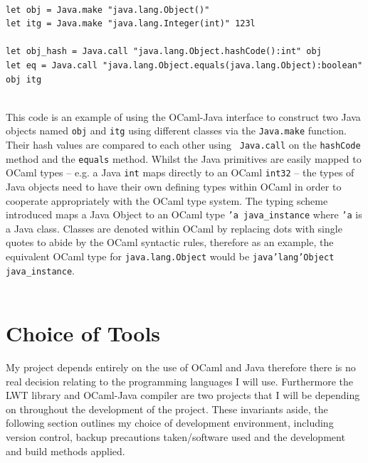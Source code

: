 \documentclass[12pt,twoside,notitlepage]{report}
\begin{document}
\hfill\\
\begin{lstlisting}
let obj = Java.make "java.lang.Object()"
let itg = Java.make "java.lang.Integer(int)" 123l

let obj_hash = Java.call "java.lang.Object.hashCode():int" obj
let eq = Java.call "java.lang.Object.equals(java.lang.Object):boolean" obj itg
\end{lstlisting}
\hfill\\
This code is an example of using the OCaml-Java interface to construct two Java objects named {\tt obj} and {\tt itg} using different classes via the {\tt Java.make} function. Their hash values are compared to each other using {\tt
Java.call} on the {\tt hashCode} method and the {\tt equals} method.  Whilst the Java primitives are easily mapped to OCaml types -- e.g. a Java {\tt int} maps directly to an OCaml {\tt int32} -- the types of Java objects need to have
their own defining types within OCaml in order to cooperate appropriately with the OCaml type system. The typing scheme introduced maps a Java Object to an OCaml type {\tt 'a java\_instance} where {\tt 'a} is a Java class.  Classes
are denoted within OCaml by replacing dots with single quotes to abide by the OCaml syntactic rules\cite{web:clerc2013}, therefore as an example, the equivalent OCaml type for {\tt java.lang.Object} would be {\tt java'lang'Object
java\_instance}.
\hfill\\
\hfill\\

\section{Choice of Tools}
\label{sec:choice_of_tools}
%
%
My project depends entirely on the use of OCaml and Java therefore there is no real decision relating to the programming languages I will use. Furthermore the LWT library and OCaml-Java compiler are two projects that I will be
depending on throughout the development of the project. These invariants aside, the following section outlines my choice of development environment, including version control, backup precautions taken/software used and the development
and build methods applied.
\end{document}

